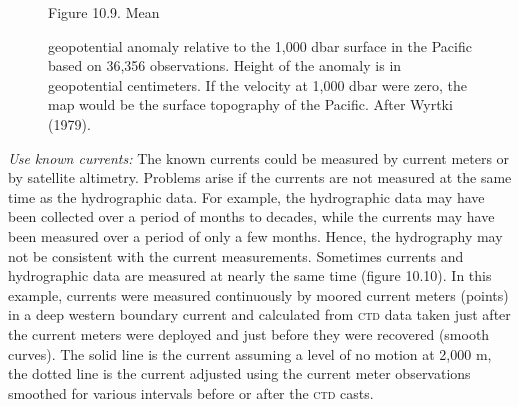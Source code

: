 \begin{enumerate}
\begin{figure}[t!]
\footnotesize
Figure 10.9. Mean \rule{0mm}{4ex}geopotential anomaly relative to the
1,000 dbar surface in the Pacific based on 36,356 observations. Height
of the anomaly is in geopotential centimeters. If the velocity at
1,000 dbar were zero, the map would be the surface topography of the
Pacific. After Wyrtki (1979).
\label{fig:wyrtkiplot}
\vspace{-4ex}
\end{figure}

\vitem \textit{Use known currents:} The known currents could be
measured by current meters or by satellite altimetry. Problems arise
if the currents are not measured at the same time as the hydrographic
data. For example,
the hydrographic data may have been collected over a period of months
to decades, while the currents may have been measured over a period of
only a few months.  Hence, the hydrography may not be consistent with
the current measurements.  Sometimes currents and hydrographic data
are measured at nearly the same time (figure 10.10). In this example,
currents were measured continuously by moored current meters (points)
in a deep western boundary current and calculated from
\textsc{ctd} data taken just after the current meters were
deployed and just before they were recovered (smooth curves). The
solid line is the current assuming a level of no motion at 2,000 m,
the dotted line is the current adjusted using the current meter
observations smoothed for various intervals before or after the
\textsc{ctd} casts.


\end{enumerate}
